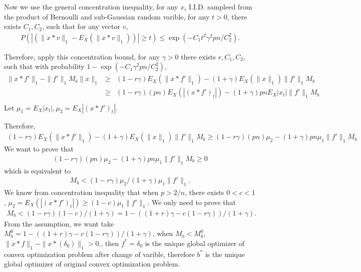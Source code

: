 \documentclass[letter, 10pt]{article}
\numberwithin{equation}{section}
\def \endprf{\hfill {\vrule height6pt width6pt depth0pt}\medskip}
\newenvironment{proof}{\noindent {\bf Proof} }{\endprf\par}
\begin{document}
\begin{proof}
Now we use the general concentration inequality, for any $x_i$ I.I.D. sampleed from the product of  Bernoulli and sub-Gaussian random varible, for any $t>0$, there exists $ C_1, C_2$, such that for any vector $v$, 
\begin{eqnarray*}
P(|( \|x*v\|_1 - E_X(\|x*v\|_1) )|\geq t) \leq \exp (-C_1 t^2 \gamma^2 pn/C_2^2).
\end{eqnarray*}

Therefore, apply this concentration bound, for any $\gamma>0$ there exists $r, C_1, C_2$, such that
with probability  $1-\exp (-C_1 \gamma^2 pn/C_2^2)$, 
\begin{eqnarray*}
\|x*f'\|_1  -\|f'\|_{1 } M_b \|x\|_1
&\geq & (1-r\gamma)  E_X(\|x*f'\|_1) - (1+\gamma)E_X(\|x\|_1) \|f'\|_{1 } M_b\\
&\geq & (1-r\gamma)  (pn)E_X(|(x*f')_t|)  -(1+\gamma) pn E_X|x_t| \|f'\|_{1 } M_b\\
\end{eqnarray*}
Let  $\mu_1 = E_X|x_t|, \mu_2 = E_X|(x*f')_t|.$

Therefore,  
\begin{eqnarray*}
(1-r\gamma)  E_X(\|x*f'\|_1) - (1+\gamma)E_X(\|x\|_1) \|f'\|_{1 } M_b  \geq (1-r\gamma)  (pn)\mu_2 -(1+\gamma)pn\mu_1 \|f'\|_{1} M_b
\end{eqnarray*}
We want to  prove that 
\begin{eqnarray*}
 (1-r\gamma)  (pn)  \mu_2-(1+\gamma)pn \mu_1 \|f'\|_{1} M_b \geq 0
\end{eqnarray*}
which is equivalent to 
\begin{eqnarray*}
M_b<  (1-r\gamma) \mu_2 / (1+\gamma) \mu_1 \|f'\|_{1}.
\end{eqnarray*}
We know from concentration inequality that when $p>2/n$,  there exists $0<c<1$, $\mu_2 = E_X(|(x*f')_t|)\geq (1-c) \mu_1  \|f'\|_1. $
We only need to prove that
\begin{eqnarray*}
M_b<  (1-r\gamma) (1-c)/ (1+\gamma) = 1- ((1+r)\gamma-c(1-r\gamma))/(1+\gamma) .
\end{eqnarray*}
From the assumption,  we want take $M_b^0  =1- ((1+r)\gamma-c(1-r\gamma))/(1+\gamma) $, when 
$M_b < M_b^0$,  $\|x*f\|_1-\|x*(\delta_0)\|_1>0$., then $f^*=\delta_0 $ is the unique global optimizer of  convex optimization problem after change of varible, therefore $b^*$ is the unique global optimizer of original convex optimization problem.
\end{proof}

\end{document}
